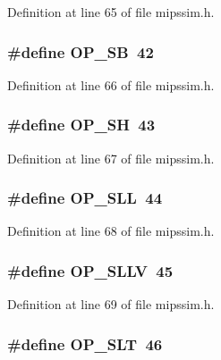 Definition at line 65 of file mipssim.\+h.

\subsubsection[{O\+P\+\_\+\+SB}]{\setlength{\rightskip}{0pt plus 5cm}\#define O\+P\+\_\+\+SB~42}\label{mipssim_8h_ab29339c51232761246b69ba07becac78}


Definition at line 66 of file mipssim.\+h.

\subsubsection[{O\+P\+\_\+\+SH}]{\setlength{\rightskip}{0pt plus 5cm}\#define O\+P\+\_\+\+SH~43}\label{mipssim_8h_aff57a3d69cf2abce177bffdb7fbf0f27}


Definition at line 67 of file mipssim.\+h.

\subsubsection[{O\+P\+\_\+\+S\+LL}]{\setlength{\rightskip}{0pt plus 5cm}\#define O\+P\+\_\+\+S\+LL~44}\label{mipssim_8h_adc75fe5a64beba40c47732fdcce6ae61}


Definition at line 68 of file mipssim.\+h.

\subsubsection[{O\+P\+\_\+\+S\+L\+LV}]{\setlength{\rightskip}{0pt plus 5cm}\#define O\+P\+\_\+\+S\+L\+LV~45}\label{mipssim_8h_ad70337f40cd966b0b3e9509477a608ac}


Definition at line 69 of file mipssim.\+h.

\subsubsection[{O\+P\+\_\+\+S\+LT}]{\setlength{\rightskip}{0pt plus 5cm}\#define O\+P\+\_\+\+S\+LT~46}\label{mipssim_8h_aeb7cdd4e715dd72d37cadf288249a8d5}


